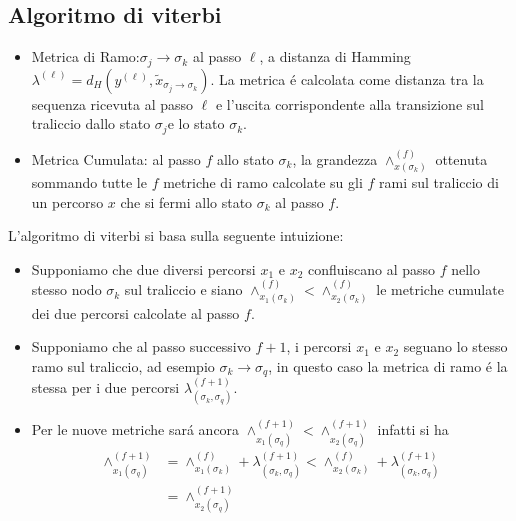     \subsection{Algoritmo di viterbi}
        \begin{itemize}
            \item {Metrica di Ramo:$\sigma_j\rightarrow\sigma_k$ al passo $\ell$, a distanza di Hamming
                $\lambda^{(\ell)}= d_H(y^{(\ell)},\tilde{x}_{\sigma_j\rightarrow\sigma_k})$. La metrica é 
                calcolata come distanza tra la sequenza ricevuta al passo $\ell$ e l'uscita corrispondente
                alla transizione sul traliccio dallo stato $\sigma_j$e lo stato $\sigma_k$.
            }
            \item {Metrica Cumulata: al passo $f$ allo stato $\sigma_k$, la grandezza $\wedge_{x(\sigma_k)}^{(f)}$ ottenuta 
                sommando tutte le $f$ metriche di ramo calcolate su gli $f$ rami sul traliccio di un percorso $x$ che si fermi allo stato 
                $\sigma_k$ al passo $f$.
            }
        \end{itemize}
        L'algoritmo di viterbi si basa sulla seguente intuizione:
        \begin{itemize}
            \item {Supponiamo che due diversi percorsi $x_1$ e $x_2$ confluiscano al passo $f$ nello stesso nodo $\sigma_k$
                sul traliccio e siano $\wedge_{x_1 (\sigma_k)}^{(f)}<\wedge_{x_2 (\sigma_k)}^{(f)}$ le metriche cumulate dei due
                percorsi calcolate al passo $f$.
            }
            \item {Supponiamo che al passo successivo $f+1$, i percorsi $x_1$ e $x_2$ seguano lo stesso
                ramo sul traliccio, ad esempio $\sigma_k\rightarrow\sigma_q$, in questo caso la metrica di ramo é la stessa per i due 
                percorsi $\lambda^{(f+1)}_{(\sigma_k,\sigma_q)}$. 
            }
            \item {Per le nuove metriche sará ancora $\wedge_{x_1 (\sigma_q)}^{(f+1)}<\wedge_{x_2 (\sigma_q)}^{(f+1)}$
                infatti si ha 
                \begin{align}
                    \wedge_{x_1 (\sigma_q)}^{(f+1)} &= \wedge_{x_1 (\sigma_k)}^{(f)}+\lambda^{(f+1)}_{(\sigma_k,\sigma_q)} < \wedge_{x_2 (\sigma_k)}^{(f)}+\lambda^{(f+1)}_{(\sigma_k,\sigma_q)} \nonumber\\
                                                    &= \wedge_{x_2 (\sigma_q)}^{(f+1)}\nonumber
                \end{align}
            }
        \end{itemize}
